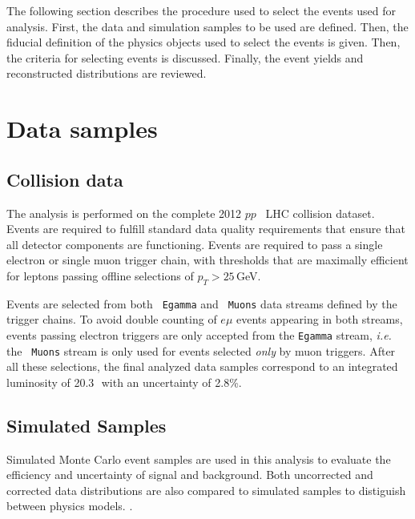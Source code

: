 The following section describes the procedure used to select the events used for analysis. First, the data and simulation samples to be used are defined. Then, the fiducial definition of the physics objects used to select the events is given. Then, the criteria for selecting events is discussed. Finally, the event yields and reconstructed distributions are reviewed. 

\section{Data samples}
\subsection{Collision data}
The analysis is performed on the complete 2012 $pp$   \tev\ LHC collision dataset. Events are required to
fulfill standard data quality requirements that ensure that all detector components are functioning. Events are required to pass a single electron or single muon trigger chain, with thresholds that are maximally efficient for leptons passing offline selections of $p_T>25$\,GeV. %

Events are selected from both \texttt{ Egamma} and \texttt{ Muons} data streams defined by the trigger chains. To avoid double counting of $e\mu$ events appearing in both streams, events passing electron triggers are only accepted from the \texttt{Egamma} stream, {\em i.e.} the \texttt{ Muons} stream is only used for events selected \emph{only} by muon triggers. 
After all these selections, the final analyzed data samples correspond to an integrated luminosity of 20.3\,\ifb\ with an uncertainty of 2.8\%.
\subsection{Simulated Samples}

Simulated Monte Carlo event samples are used in this analysis to evaluate the efficiency and uncertainty of signal and background.  Both uncorrected and corrected data distributions are also compared to simulated samples to distiguish between physics models. .%

